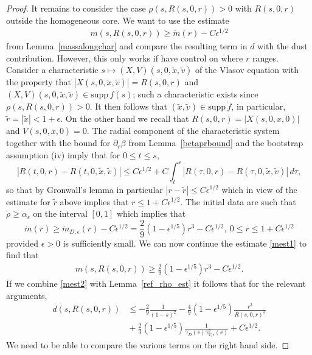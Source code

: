 \documentclass[11pt]{article}
\def\supp{\mathrm{supp}\,}
\begin{document}
\begin{proof}
  It remains to consider the case $\rho(s,R(s,0,r))>0$ with $R(s,0,r)$
  outside the homogeneous core. We want to use the estimate
  \begin{align}\label{mest1}
  m(s,R(s,0,r)) \geq \mathring m(r) - C\epsilon^{1/2}
  \end{align}
  from Lemma~\ref{massalongchar} and compare the resulting term in $d$ with the
  dust contribution. However, this only works if have control on where $r$
  ranges.
  Consider a characteristic
  $s\mapsto (X,V)(s,0,\tilde x,\tilde v)$
  of the Vlasov equation with the property that
  $|X(s,0,\tilde x,\tilde v)| = R(s,0,r)$ and
  $(X,V)(s,0,\tilde x,\tilde v)\in \supp f(s)$; such a characteristic
  exists since $\rho(s,R(s,0,r))>0$. It then follows that
  $(\tilde x,\tilde v)\in \supp\mathring f$,
  in particular, $\tilde r = |\tilde x|< 1+\epsilon$.
  On the other hand we recall that
  $R(s,0,r)=|X(s,0,x,0)|$ and $V(s,0,x,0)=0$. The radial component of
  the characteristic system together with the bound for $\partial_r \beta$
  from Lemma~\ref{betaprbound} and the bootstrap assumption (iv) imply that
  for $0\leq t\leq s$,
  \[
  |R(t,0,r) - R(t,0,\tilde x,\tilde v)| \leq C \epsilon^{1/2}
  + C \int_t^s |R(\tau,0,r) - R(\tau,0,\tilde x,\tilde v)|\, d\tau,
  \]
  so that by Gronwall's lemma in particular
  $|r-\tilde r|\leq  C \epsilon^{1/2}$ which
  in view of the estimate for $\tilde r$ above implies that
  $r \leq 1 + C \epsilon^{1/2}$. The initial data are such that
  $\mathring\rho\geq\alpha_\epsilon$
  on the interval $[0,1]$ which
  implies that
  \[
  \mathring m(r) \geq \mathring m_{D,\epsilon}(r) - C\epsilon^{1/2}
  =\frac{2}{9} (1-\epsilon^{1/5}) r^3 - C\epsilon^{1/2},\
  0\leq r\leq 1+C \epsilon^{1/2}
  \]
  provided $\epsilon>0$ is sufficiently small. We can now continue
  the estimate \eqref{mest1} to find that
  \begin{align}\label{mest2}
    m(s,R(s,0,r)) \geq \frac{2}{9} (1-\epsilon^{1/5}) r^3 - C\epsilon^{1/2} .   
  \end{align}
  If we combine \eqref{mest2} with
  Lemma~\ref{ref_rho_est} it follows that for the relevant arguments,
  \begin{align*}
    d(s,R(s,0,r))
    &
    \leq
    -  \frac{2}{9}\frac{1}{(1-s)^2}
    - \frac{4}{9} (1-\epsilon^{1/5}) \frac{r^3}{R(s,0,r)^3} \\
    &
    {}+ \frac{2}{3}(1-\epsilon^{1/5})\frac{1}{\gamma_D(s) \gamma^2_{V,\epsilon}(s)}
    + C \epsilon^{1/2}.
  \end{align*}
  We need to be able to compare the various terms on the right hand side.

\end{proof}
\end{document}
